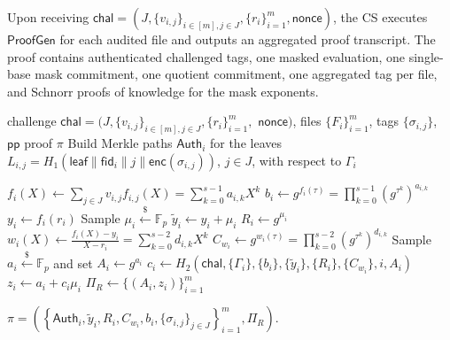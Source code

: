 \documentclass[lettersize,journal]{IEEEtran}
\newcommand{\FF}{\mathbb{F}}
\newcommand{\ProofGen}{\mathsf{ProofGen}}
\begin{document}
Upon receiving $\mathsf{chal}=(J,\{v_{i,j}\}_{i\in[m],j\in J},\{r_i\}_{i=1}^m,\mathsf{nonce})$, the CS executes $\ProofGen$ for each audited file and outputs an aggregated proof transcript. The proof contains authenticated challenged tags, one masked evaluation, one single-base mask commitment, one quotient commitment, one aggregated tag per file, and Schnorr proofs of knowledge for the mask exponents.


\begin{algorithm}[h]
\caption{\textbf{$\ProofGen$}}
\label{alg:proofgen}
\begin{algorithmic}[1]
\Require challenge $\mathsf{chal}=(J,\{v_{i,j}\}_{i\in[m],j\in J},\{r_i\}_{i=1}^m,$ $\mathsf{nonce})$, files $\{F_i\}_{i=1}^m$, tags $\{\sigma_{i,j}\}$, $\mathsf{pp}$
\Ensure proof $\pi$
    \State Build Merkle paths $\mathsf{Auth}_i$ for the leaves $L_{i,j}=H_1(\mathsf{leaf}\|\mathsf{fid}_i\|j\|\mathsf{enc}(\sigma_{i,j}))$, $j\in J$, with respect to $\Gamma_i$
    
    \State $f_i(X) \gets \sum_{j\in J} v_{i,j} f_{i,j}(X)=\sum_{k=0}^{s-1} a_{i,k}X^k$
    \State $b_i \gets g^{f_i(\tau)}=\prod_{k=0}^{s-1}(g^{\tau^k})^{a_{i,k}}$
    \State $y_i \gets f_i(r_i)$
    \State Sample $\mu_i \xleftarrow{\$} \FF_p$
    \State $\tilde{y}_i \gets y_i+\mu_i$
    \State $R_i \gets g^{\mu_i}$
    \State $w_i(X) \gets \frac{f_i(X)-y_i}{X-r_i}=\sum_{k=0}^{s-2}d_{i,k}X^k$
    \State $C_{w_i}\gets g^{w_i(\tau)}=\prod_{k=0}^{s-2}(g^{\tau^k})^{d_{i,k}}$
\EndFor
{}
    \State Sample $a_i\xleftarrow{\$}\FF_p$ and set $A_i\gets g^{a_i}$
    \State $c_i\gets H_2(\mathsf{chal},\{\Gamma_i\},\{b_i\},\{\tilde{y}_i\},\{R_i\},\{C_{w_i}\},i,A_i)$
    \State $z_i\gets a_i+c_i\mu_i$
\EndFor
\State $\Pi_R\gets\{(A_i,z_i)\}_{i=1}^m$

\State \Return
$
\pi=
\left(
\left\{
\mathsf{Auth}_i,\tilde{y}_i,R_i,C_{w_i},b_i,\{\sigma_{i,j}\}_{j\in J}
\right\}_{i=1}^m,\Pi_R
\right).
$
\end{algorithmic}
\end{algorithm}
\end{document}
